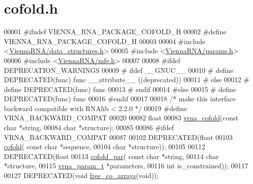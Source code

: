 \hypertarget{cofold_8h_source}{\section{cofold.\+h}
\label{cofold_8h_source}
}

\begin{DoxyCode}
00001 \textcolor{preprocessor}{#ifndef VIENNA\_RNA\_PACKAGE\_COFOLD\_H}
00002 \textcolor{preprocessor}{#define VIENNA\_RNA\_PACKAGE\_COFOLD\_H}
00003 
00004 \textcolor{preprocessor}{#include <\hyperlink{data__structures_8h}{ViennaRNA/data\_structures.h}>}
00005 \textcolor{preprocessor}{#include <\hyperlink{params_8h}{ViennaRNA/params.h}>}
00006 \textcolor{preprocessor}{#include <\hyperlink{mfe_8h}{ViennaRNA/mfe.h}>}
00007 
00008 \textcolor{preprocessor}{#ifdef DEPRECATION\_WARNINGS}
00009 \textcolor{preprocessor}{# ifdef \_\_GNUC\_\_}
00010 \textcolor{preprocessor}{#  define DEPRECATED(func) func \_\_attribute\_\_ ((deprecated))}
00011 \textcolor{preprocessor}{# else}
00012 \textcolor{preprocessor}{#  define DEPRECATED(func) func}
00013 \textcolor{preprocessor}{# endif}
00014 \textcolor{preprocessor}{#else}
00015 \textcolor{preprocessor}{# define DEPRECATED(func) func}
00016 \textcolor{preprocessor}{#endif}
00017 
00018 \textcolor{comment}{/* make this interface backward compatible with RNAlib < 2.2.0 */}
00019 \textcolor{preprocessor}{#define VRNA\_BACKWARD\_COMPAT}
00020 
00082 \textcolor{keywordtype}{float}
00083 \hyperlink{group__mfe__cofold_ga45515db181f17653ef7ef5487ef36d08}{vrna\_cofold}(\textcolor{keyword}{const} \textcolor{keywordtype}{char} *\textcolor{keywordtype}{string},
00084             \textcolor{keywordtype}{char} *structure);
00085 
00086 \textcolor{preprocessor}{#ifdef VRNA\_BACKWARD\_COMPAT}
00087 
00102 DEPRECATED(\textcolor{keywordtype}{float}
00103 \hyperlink{group__mfe__cofold_gabc8517f22cfe70595ee81fc837910d52}{cofold}( \textcolor{keyword}{const} \textcolor{keywordtype}{char} *sequence,
00104         \textcolor{keywordtype}{char} *structure));
00105 
00112 DEPRECATED(\textcolor{keywordtype}{float}
00113 \hyperlink{group__mfe__cofold_ga7612cfeeb1b793f1e4179b1eb53df1f3}{cofold\_par}( \textcolor{keyword}{const} \textcolor{keywordtype}{char} *\textcolor{keywordtype}{string},
00114             \textcolor{keywordtype}{char} *structure,
00115             \hyperlink{group__energy__parameters_structvrna__param__s}{vrna\_param\_t} *parameters,
00116             \textcolor{keywordtype}{int} is\_constrained));
00117 
00127 DEPRECATED(\textcolor{keywordtype}{void} \hyperlink{group__mfe__cofold_gaafb33d7473eb9af9d1b168ca8761c41a}{free\_co\_arrays}(\textcolor{keywordtype}{void}));

\end{DoxyCode}
